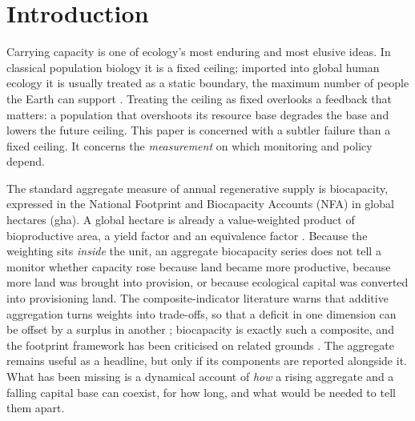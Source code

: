 \documentclass[preprint,12pt,authoryear]{elsarticle}
\begin{document}
\section{Introduction}\label{sec:intro}

Carrying capacity is one of ecology's most enduring and most elusive ideas. In classical population biology it is a fixed ceiling; imported into global human ecology it is usually treated as a static boundary, the maximum number of people the Earth can support \citep[cf.][]{Cohen1995}. Treating the ceiling as fixed overlooks a feedback that matters: a population that overshoots its resource base degrades the base and lowers the future ceiling. This paper is concerned with a subtler failure than a fixed ceiling. It concerns the \emph{measurement} on which monitoring and policy depend.

The standard aggregate measure of annual regenerative supply is biocapacity, expressed in the National Footprint and Biocapacity Accounts (NFA) in global hectares (gha). A global hectare is already a value-weighted product of bioproductive area, a yield factor and an equivalence factor \citep{Borucke2013,Lin2018}. Because the weighting sits \emph{inside} the unit, an aggregate biocapacity series does not tell a monitor whether capacity rose because land became more productive, because more land was brought into provision, or because ecological capital was converted into provisioning land. The composite-indicator literature warns that additive aggregation turns weights into trade-offs, so that a deficit in one dimension can be offset by a surplus in another \citep{Nardo2008,Becker2017,Fischer2022}; biocapacity is exactly such a composite, and the footprint framework has been criticised on related grounds \citep{Blomqvist2013,GiampietroSaltelli2014,vdBerghGrazi2015,Galli2016}. The aggregate remains useful as a headline, but only if its components are reported alongside it. What has been missing is a dynamical account of \emph{how} a rising aggregate and a falling capital base can coexist, for how long, and what would be needed to tell them apart.
\end{document}
